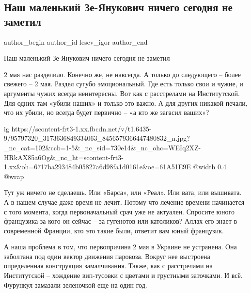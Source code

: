  
 
 
 
 
 
\subsection{Наш маленький Зе-Янукович ничего сегодня не заметил}
\label{sec:02_05_2020.fb.lesev_igor.1.2_maja_zelenskii}
 
\ifcmt
 author_begin
   author_id lesev_igor
 author_end
\fi

Наш маленький Зе-Янукович ничего сегодня не заметил

2 мая нас разделило. Конечно же, не навсегда. А только до следующего – более
свежего – 2 мая. Раздел сугубо эмоциональный. Где есть только свои и чужие, и
аргументы чужих всегда неинтересны. Вот как с расстрелами на Институтской. Для
одних там «убили наших» и только это важно. А для других никакой печали, что их
убили, но всегда будет первично – «а кто же загасил ваших»?

\ifcmt
  ig https://scontent-frt3-1.xx.fbcdn.net/v/t1.6435-9/95797320_3173636849334063_8456579366447480832_n.jpg?_nc_cat=102&ccb=1-5&_nc_sid=730e14&_nc_ohc=WEIq2XZ-HRkAX85a6Og&_nc_ht=scontent-frt3-1.xx&oh=6717ba293484b05827a6d98fa1d0161e&oe=61A51E9E
  @width 0.4
  @wrap 
\fi

Тут уж ничего не сделаешь. Или «Барса», или «Реал». Или вата, или вышивата. А в
нашем случае даже время не лечит. Потому что лечение времени начинается с того
момента, когда первоначальный срач уже не актуален. Спросите юного французика
за кого он сейчас – за гугенотов или католиков? Аллах его знает в современной
Франции, кто это такие были, ответит вам юный французик.

А наша проблема в том, что первопричина 2 мая в Украине не устранена. Она
заболтана под один вектор движения паровоза. Вокруг нее выстроена определенная
конструкция замалчивания. Также, как с расстрелами на Институтской – хождение
вип-тусовки с цветами и грустными заточками. И всё. Фурункул замазали
зеленочкой еще на один год.

